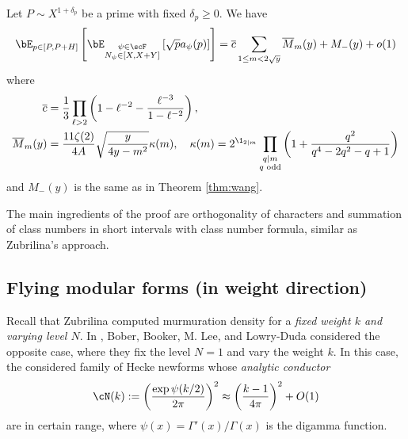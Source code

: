 \begin{theorem}
    \label{thm:wanglocal}
    Let $P \sim X^{1 + \delta_p}$ be a prime with fixed $\delta_p \ge 0$.
    We have
    \begin{equation}
        \bE_{p \in [P, P + H]}\left[\bE_{\substack{\psi \in \scF \\ N_\psi \in [X, X + Y]}}\left[\sqrt{p} a_\psi(p)\right]\right] = \overline{c} \sum_{1 \le m < 2 \sqrt{y}} \overline{M}_m(y) + M_-(y) + o(1)
    \end{equation}
    where
    \begin{align*}
        \overline{c} &= \frac{1}{3} \prod_{\ell > 2} \left(1 - \ell^{-2} - \frac{\ell^{-3}}{1 - \ell^{-2}}\right),\\
        \overline{M}_m(y) &= \frac{11\zeta(2)}{4A} \sqrt{\frac{y}{4y - m^2}} \kappa(m), \quad \kappa(m) = 2^{\1_{2 \mid m}} \prod_{\substack{q \mid m \\ q \text{ odd}}} \left(1 + \frac{q^2}{q^4 - 2q^2 - q + 1}\right)
    \end{align*}
    and $M_-(y)$ is the same as in Theorem \ref{thm:wang}.
\end{theorem}


The main ingredients of the proof are orthogonality of characters and summation of class numbers in short intervals with class number formula, similar as Zubrilina's approach.

\subsection{Flying modular forms (in weight direction)}


Recall that Zubrilina computed murmuration density for a \emph{fixed weight $k$ and varying level $N$}.
In \cite{bober2023murmurations}, Bober, Booker, M. Lee, and Lowry-Duda considered the opposite case, where they fix the level $N = 1$ and vary the weight $k$.
In this case, the considered family of Hecke newforms whose \emph{analytic conductor}
\[
\cN(k) := \left(\frac{\exp \psi(k/2)}{2 \pi}\right)^2 \approx \left(\frac{k-1}{4 \pi}\right)^2 + O(1)
\]
are in certain range, where $\psi(x) = \Gamma'(x)/\Gamma(x)$ is the digamma function.

